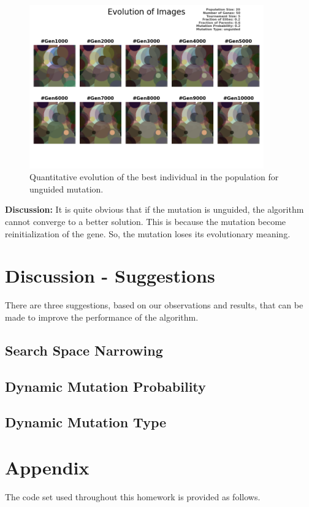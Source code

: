 \documentclass{assignment}
\begin{document}
\begin{figure}[!htb]
    \centering
    \includegraphics[width=0.9\textwidth]{figures/images_output_20_50_5_0.2_0.6_0.2_unguided.png}
    \caption{Quantitative evolution of the best individual in the population for unguided mutation.}
    \label{fig:unguided_image}
\end{figure}

\textbf{Discussion:} It is quite obvious that if the mutation is unguided, the algorithm cannot converge to a better solution. This is because the mutation become reinitialization of the gene. So, the mutation loses its evolutionary meaning.

\section{Discussion - Suggestions}

There are three suggestions, based on our observations and results, that can be made to improve the performance of the algorithm.

\subsection{Search Space Narrowing}

\subsection{Dynamic Mutation Probability}

\subsection{Dynamic Mutation Type}

\section*{Appendix}
The code set used throughout this homework is provided as follows. 

% 

% 


\nocite{*} 
\end{document}
